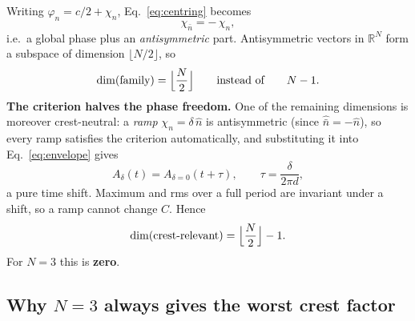 \documentclass[11pt,a4paper]{article}
\newcommand{\crest}{\ensuremath{C}}
\begin{document}
Writing $\varphi_n = c/2 + \chi_n$, Eq.~\eqref{eq:centring} becomes
\begin{equation}
  \chi_{\bar n} = -\,\chi_n ,
  \label{eq:antisym}
\end{equation}
i.e.\ a global phase plus an \emph{antisymmetric} part. Antisymmetric vectors
in $\mathbb{R}^N$ form a subspace of dimension $\lfloor N/2\rfloor$, so
\begin{equation}
  \dim(\text{family}) = \Bigl\lfloor \frac{N}{2} \Bigr\rfloor
  \qquad\text{instead of}\qquad N-1 .
\end{equation}
\textbf{The criterion halves the phase freedom.} One of the remaining
dimensions is moreover crest-neutral: a \emph{ramp}
$\chi_n = \delta\,\hat n$ is antisymmetric (since
$\hat{\bar n} = -\hat n$), so every ramp satisfies the criterion
automatically, and substituting it into Eq.~\eqref{eq:envelope} gives
\begin{equation}
  A_\delta(t) = A_{\delta=0}(t+\tau) , \qquad \tau = \frac{\delta}{2\pi d} ,
  \label{eq:rampshift}
\end{equation}
a pure time shift. Maximum and rms over a full period are invariant under a
shift, so a ramp cannot change \crest. Hence
\begin{equation}
  \dim(\text{crest-relevant}) = \Bigl\lfloor \frac{N}{2} \Bigr\rfloor - 1 .
  \label{eq:dimcrest}
\end{equation}
For $N=3$ this is \textbf{zero}.

\subsection{Why \boldmath$N=3$ always gives the worst crest factor}
\label{sec:n3}
\end{document}
